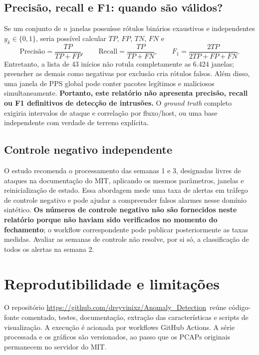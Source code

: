 \documentclass[12pt,oneside,a4paper,brazil]{abntex2}
\newcommand{\artifact}{\url{https://github.com/dreyvinixz/Anomaly_Detection}}
\begin{document}
\section{Precisão, recall e F1: quando são válidos?}
Se um conjunto de $n$ janelas possuísse rótulos binários exaustivos e independentes $y_k\in\{0,1\}$, seria possível calcular $TP$, $FP$, $TN$, $FN$ e
\begin{equation}
 \text{Precisão}=\frac{TP}{TP+FP},\qquad\text{Recall}=\frac{TP}{TP+FN},\qquad
 F_1=\frac{2TP}{2TP+FP+FN}.
\end{equation}
Entretanto, a lista de 43 inícios não rotula completamente as 6.424 janelas; preencher as demais como negativas por exclusão cria rótulos falsos. Além disso, uma janela de PPS global pode conter pacotes legítimos e maliciosos simultaneamente. \textbf{Portanto, este relatório não apresenta precisão, recall ou F1 definitivos de detecção de intrusões.} O \textit{ground truth} completo exigiria intervalos de ataque e correlação por fluxo/host, ou uma base independente com verdade de terreno explícita.

\section{Controle negativo independente}
O estudo recomenda o processamento das semanas 1 e 3, designadas livres de ataques na documentação do MIT, aplicando os mesmos parâmetros, janelas e reinicialização de estado. Essa abordagem mede uma taxa de alertas em tráfego de controle negativo e pode ajudar a compreender falsos alarmes nesse domínio sintético. \textbf{Os números de controle negativo não são fornecidos neste relatório porque não haviam sido verificados no momento do fechamento}; o workflow correspondente pode publicar posteriormente as taxas medidas. Avaliar as semanas de controle não resolve, por si só, a classificação de todos os alertas na semana 2.

\chapter{Reprodutibilidade e limitações}
O repositório \artifact\ reúne código-fonte comentado, testes, documentação, extração das características e scripts de visualização. A execução é acionada por workflows GitHub Actions. A série processada e os gráficos são versionados, ao passo que os PCAPs originais permanecem no servidor do MIT.
\end{document}
